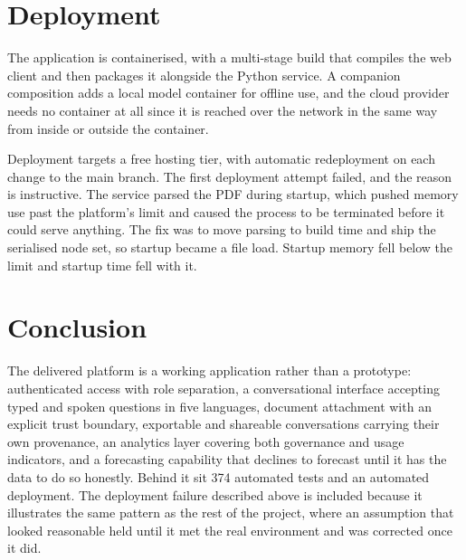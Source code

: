 \section{Deployment}

The application is containerised, with a multi-stage build that compiles the web client and then packages it alongside the Python service. A companion composition adds a local model container for offline use, and the cloud provider needs no container at all since it is reached over the network in the same way from inside or outside the container.

Deployment targets a free hosting tier, with automatic redeployment on each change to the main branch. The first deployment attempt failed, and the reason is instructive. The service parsed the PDF during startup, which pushed memory use past the platform's limit and caused the process to be terminated before it could serve anything. The fix was to move parsing to build time and ship the serialised node set, so startup became a file load. Startup memory fell below the limit and startup time fell with it.

\section*{Conclusion}

The delivered platform is a working application rather than a prototype: authenticated access with role separation, a conversational interface accepting typed and spoken questions in five languages, document attachment with an explicit trust boundary, exportable and shareable conversations carrying their own provenance, an analytics layer covering both governance and usage indicators, and a forecasting capability that declines to forecast until it has the data to do so honestly. Behind it sit 374 automated tests and an automated deployment. The deployment failure described above is included because it illustrates the same pattern as the rest of the project, where an assumption that looked reasonable held until it met the real environment and was corrected once it did.
